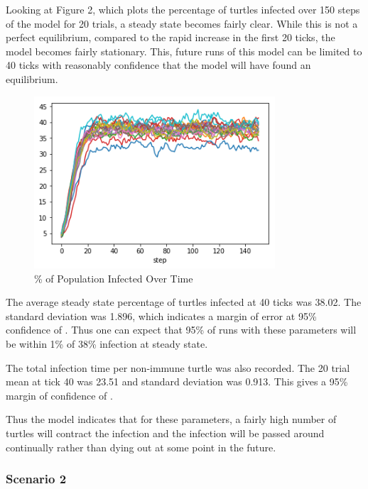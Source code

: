 \documentclass[11pt]{article} %
\begin{document}

Looking at Figure 2, which plots the percentage of turtles infected over 150 steps of the model for 20 trials, a steady state becomes fairly clear. While this is not a perfect equilibrium, compared to the rapid increase in the first 20 ticks, the model becomes fairly stationary.  This, future runs of this model can be limited to 40 ticks with reasonably confidence that the model will have found an equilibrium. 

\begin{figure}
\centering
\includegraphics[width=0.8\textwidth]{scen_1_steady_state}
\caption{\% of Population Infected Over Time}
\end{figure}



The average steady state percentage of turtles infected at 40 ticks was 38.02. The standard deviation was 1.896, which indicates a margin of error at 95\% confidence of . Thus one can expect that 95\% of runs with these parameters will be within 1\% of 38\% infection at steady state. 

The total infection time per non-immune turtle was also recorded. The 20 trial mean at tick 40 was 23.51 and standard deviation was 0.913. This gives a 95\% margin of confidence of . 


Thus the model indicates that for these parameters, a fairly high number of turtles will contract the infection and the infection will be passed around continually rather than dying out at some point in the future. 




\subsubsection{Scenario 2}
\end{document}
